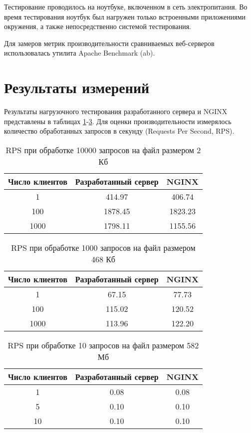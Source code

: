Тестирование проводилось на ноутбуке, включенном в сеть электропитания. Во время тестирования ноутбук был нагружен только встроенными приложениями окружения, а также непосредственно системой тестирования.

Для замеров метрик производительности сравниваемых веб-серверов использовалась утилита Apache Benchmark (ab). \cite{ab}



\section{Результаты измерений}

Результаты нагрузочного тестирования разработанного сервера и NGINX представлены в таблицах \ref{tab:1}-\ref{tab:3}. Для оценки производительности измерялось количество обработанных запросов в секунду (Requests Per Second, RPS).

\begin{table}[H]
	\centering
	\caption{RPS при обработке 10000 запросов на файл размером 2 Кб}
	\label{tab:1}
	\begin{tabular}{|c|c|c|}
		\hline
		Число клиентов & Разработанный сервер & NGINX \\ \hline
		1 & 414.97 & 406.74 \\ \hline
		100 & 1878.45 & 1823.23 \\ \hline
		1000 & 1798.11 & 1155.56 \\ \hline
	\end{tabular}
\end{table}

\begin{table}[H]
	\centering
	\caption{RPS при обработке 1000 запросов на файл размером 468 Кб}
	\label{tab:2}
	\begin{tabular}{|c|c|c|}
		\hline
		Число клиентов & Разработанный сервер & NGINX \\ \hline
		1 & 67.15 & 77.73 \\ \hline
		100 & 115.02 & 120.52 \\ \hline
		1000 & 113.96 & 122.20 \\ \hline
	\end{tabular}
\end{table}

\begin{table}[H]
	\centering
	\caption{RPS при обработке 10 запросов на файл размером 582 Мб}
	\label{tab:3}
	\begin{tabular}{|c|c|c|}
		\hline
		Число клиентов & Разработанный сервер & NGINX \\ \hline
		1 & 0.08 & 0.08 \\ \hline
		5 & 0.10 & 0.10 \\ \hline
		10 & 0.10 & 0.10 \\ \hline
	\end{tabular}
\end{table}



